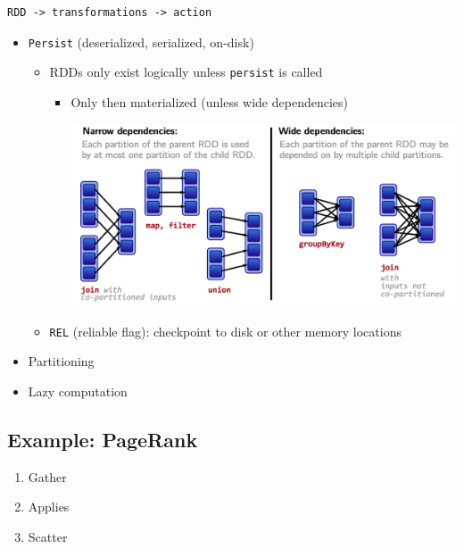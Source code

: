 \documentclass[11pt]{article}
\begin{document}
\begin{verbatim}
RDD -> transformations -> action
\end{verbatim}

\begin{itemize}
\item \texttt{Persist} (deserialized, serialized, on-disk)
\begin{itemize}
\item RDDs only exist logically unless \texttt{persist} is called
\begin{itemize}
\item Only then materialized (unless wide dependencies)

\includegraphics[width=.9\linewidth]{diagrams/widedep.png}
\end{itemize}

\item \texttt{REL} (reliable flag): checkpoint to disk or other memory locations
\end{itemize}
\item Partitioning
\item Lazy computation
\end{itemize}

\subsection{Example: PageRank}
\label{sec:orgheadline7}

\begin{enumerate}
\item Gather
\item Applies
\item Scatter
\end{enumerate}
\end{document}
